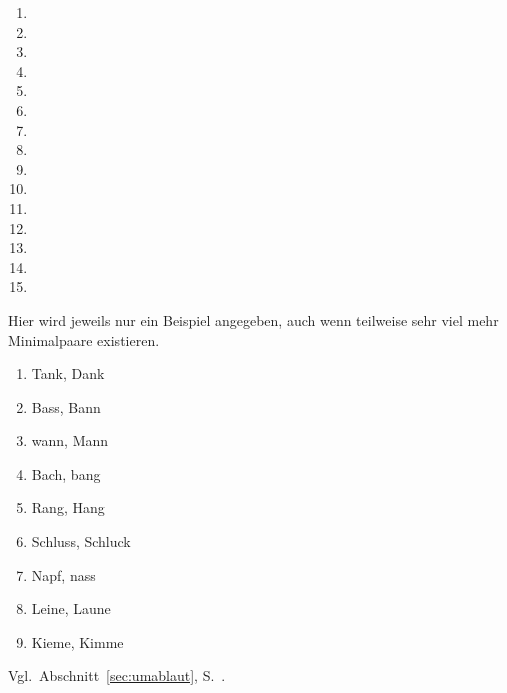 
\begin{enumerate}\Lf
  \item {} 
  \item \textipa{[ni:z@n]}
  \item \textipa{[vIs@n]}
  \item {}
  \item \textipa{[defini\t{ts}Jo:n]}
  \item \textipa{[f5P\t{aE}nsh\t{aO}s]}
  \item \textipa{[kl\t{aE}nI\c{c}k\t{aE}t]}
  \item \textipa{[za:n@t\t{O@}t@]}
  \item \textipa{[hu:st@nzaft]}
  \item \textipa{[Po:n@]}
  \item \textipa{[b@StImUN]}
  \item \textipa{[tu:X]}
  \item \textipa{[SUps@n]}
  \item \textipa{[b\t{E@}\c{c}@n]}
  \item {}
\end{enumerate}



Hier wird jeweils nur ein Beispiel angegeben, auch wenn teilweise sehr viel mehr Minimalpaare existieren.

\begin{enumerate}\Lf
  \item Tank, Dank
  \item Bass, Bann
  \item wann, Mann
  \item Bach, bang
  \item Rang, Hang
  \item Schluss, Schluck
  \item Napf, nass
  \item Leine, Laune
  \item Kieme, Kimme
\end{enumerate}


Vgl.\ Abschnitt~\ref{sec:umablaut}, S.~\pageref{sec:umablaut}.


